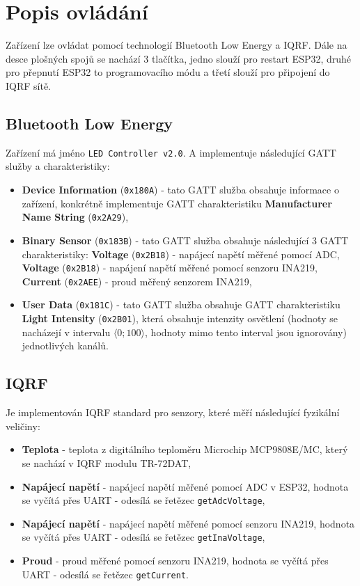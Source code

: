 \documentclass[12pt]{article}
\begin{document}
	\section{Popis ovládání}
	
	Zařízení lze ovládat pomocí technologií Bluetooth Low Energy a IQRF. Dále na desce plošných spojů se nachází 3 tlačítka, jedno slouží pro restart ESP32, druhé pro přepnutí ESP32 to programovacího módu a třetí slouží pro připojení do IQRF sítě.
	
	\subsection{Bluetooth Low Energy}
	
	Zařízení má jméno \texttt{LED Controller v2.0}. A implementuje následující GATT služby a charakteristiky:
	\begin{itemize}
		\item \textbf{Device Information} (\texttt{0x180A}) - tato GATT služba obsahuje informace o zařízení, konkrétně implementuje GATT charakteristiku \textbf{Manufacturer Name String} (\texttt{0x2A29}),
		\item \textbf{Binary Sensor} (\texttt{0x183B}) - tato GATT služba obsahuje následující 3 GATT charakteristiky: \textbf{Voltage} (\texttt{0x2B18}) - napájecí napětí měřené pomocí ADC, \textbf{Voltage} (\texttt{0x2B18}) - napájení napětí měřené pomocí senzoru INA219, \textbf{Current} (\texttt{0x2AEE}) - proud měřený senzorem INA219,
		\item \textbf{User Data} (\texttt{0x181C}) - tato GATT služba obsahuje GATT charakteristiku \textbf{Light Intensity} (\texttt{0x2B01}), která obsahuje intenzity osvětlení (hodnoty se nacházejí v intervalu  $\langle 0; 100 \rangle$, hodnoty mimo tento interval jsou ignorovány) jednotlivých kanálů.
	\end{itemize}
	
	\subsection{IQRF}
	
	Je implementován IQRF standard pro senzory\cite{iqrf/standard-sensor}, které měří následující fyzikální veličiny:
	
	\begin{itemize}
		\item \textbf{Teplota} - teplota z digitálního teploměru Microchip MCP9808E/MC, který se nachází v IQRF modulu TR-72DAT,
		\item \textbf{Napájecí napětí} - napájecí napětí měřené pomocí ADC v ESP32, hodnota se vyčítá přes UART - odesílá se řetězec \texttt{getAdcVoltage},
		\item \textbf{Napájecí napětí} - napájecí napětí měřené pomocí senzoru INA219, hodnota se vyčítá přes UART - odesílá se řetězec \texttt{getInaVoltage},
		\item \textbf{Proud} - proud měřené pomocí senzoru INA219, hodnota se vyčítá přes UART - odesílá se řetězec \texttt{getCurrent}.
\end{itemize}		
	
\end{document}
